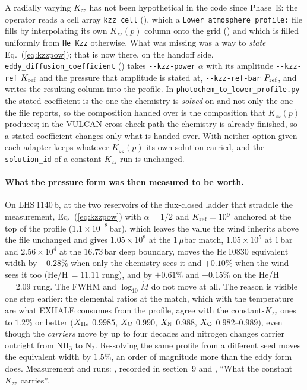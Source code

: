 \documentclass[english,a4paper]{my_memo}
\begin{document}
A radially varying $K_{zz}$ has not been hypothetical in the code since
Phase~E: the operator reads a cell array \texttt{kzz\_cell}
(), which a
\texttt{Lower atmosphere profile:} file fills by interpolating its own
$K_{zz}(p)$ column onto the grid
() and which is
filled uniformly from \texttt{He\_Kzz} otherwise. What was missing was a way
to \emph{state} Eq.~(\ref{eq:kzzpow}); that is now there, on the handoff
side. \texttt{eddy\_diffusion\_coefficient}
() takes \texttt{-{}-kzz-power}
$\alpha$ with its amplitude \texttt{-{}-kzz-ref} $K_{\rm ref}$ and the
pressure that amplitude is stated at, \texttt{-{}-kzz-ref-bar}
$P_{\rm ref}$, and writes the resulting column into the profile. In
\texttt{photochem\_to\_lower\_profile.py} the stated coefficient is the one
the chemistry is \emph{solved} on and not only the one the file reports, so
the composition handed over is the composition that $K_{zz}(p)$ produces; in
the VULCAN cross-check path the chemistry is already finished, so a stated
coefficient changes only what is handed over. With neither option given
each adapter keeps whatever $K_{zz}(p)$ its own solution carried, and the
\texttt{solution\_id} of a constant-$K_{zz}$ run is unchanged.

\paragraph{What the pressure form was then measured to be worth.} On
LHS\,1140\,b, at the two reservoirs of the flux-closed ladder that straddle
the measurement, Eq.~(\ref{eq:kzzpow}) with $\alpha = 1/2$ and
$K_{\rm ref} = 10^{9}$ anchored at the top of the profile
($1.1\times10^{-8}$\,bar), which leaves the value the wind inherits above
the file unchanged and gives $1.05\times10^{8}$ at the $1\,\mu$bar match,
$1.05\times10^{5}$ at $1$\,bar and $2.56\times10^{4}$ at the $16.73$\,bar
deep boundary, moves the He\,10830 equivalent width by $+0.28\%$ when only
the chemistry sees it and $+0.10\%$ when the wind sees it too
(He/H\,$=11.11$ rung), and by $+0.61\%$ and $-0.15\%$ on the He/H\,$=2.09$
rung. The FWHM and $\log_{10}\dot M$ do not move at all. The reason is
visible one step earlier: the elemental ratios at the match, which with the
temperature are what EXHALE consumes from the profile, agree with the
constant-$K_{zz}$ ones to $1.2\%$ or better ($X_{\rm He}$ $0.9985$,
$X_{\rm C}$ $0.990$, $X_{\rm N}$ $0.988$, $X_{\rm O}$ $0.982$--$0.989$),
even though the \emph{carriers} move by up to four decades and nitrogen
changes carrier outright from NH$_3$ to N$_2$. Re-solving the same profile
from a different seed moves the equivalent width by $1.5\%$, an order of
magnitude more than the eddy form does. Measurement and runs:
, recorded in
 section~9 and
, ``What the constant $K_{zz}$
carries''.
\end{document}
